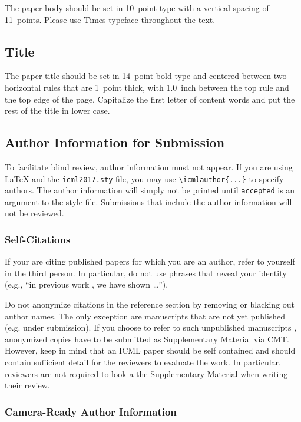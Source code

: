 \documentclass{article}
\begin{document}
The paper body should be set in 10~point type with a vertical spacing
of 11~points. Please use Times typeface throughout the text.

\subsection{Title}

The paper title should be set in 14~point bold type and centered
between two horizontal rules that are 1~point thick, with 1.0~inch
between the top rule and the top edge of the page. Capitalize the
first letter of content words and put the rest of the title in lower
case.

\subsection{Author Information for Submission}
\label{author info}

To facilitate blind review, author information must not appear.  If
you are using \LaTeX\/ and the \texttt{icml2017.sty} file, you may use
\verb+\icmlauthor{...}+ to specify authors.  The author information
will simply not be printed until {\tt accepted} is an argument to the
style file. Submissions that include the author information will not
be reviewed.

\subsubsection{Self-Citations}

If your are citing published papers for which you are an author, refer
to yourself in the third person. In particular, do not use phrases
that reveal your identity (e.g., ``in previous work \cite{langley00}, we 
have shown \ldots'').

Do not anonymize citations in the reference section by removing or
blacking out author names. The only exception are manuscripts that are
not yet published (e.g. under submission). If you choose to refer to
such unpublished manuscripts \cite{anonymous}, anonymized copies have 
to be submitted
as Supplementary Material via CMT. However, keep in mind that an ICML
paper should be self contained and should contain sufficient detail
for the reviewers to evaluate the work. In particular, reviewers are
not required to look a the Supplementary Material when writing their
review.

\subsubsection{Camera-Ready Author Information}
\label{final author}
\end{document}
